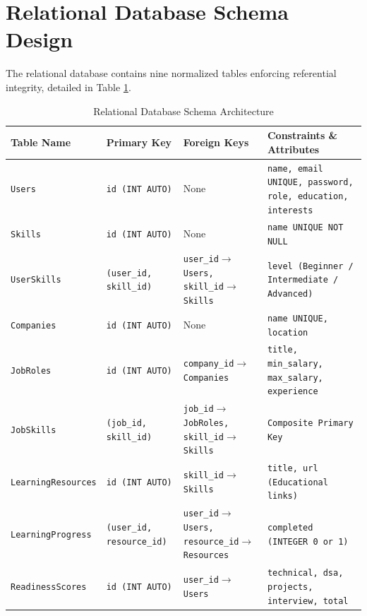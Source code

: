 \documentclass[11pt,a4paper]{report}
\begin{document}
\section{Relational Database Schema Design}
The relational database contains nine normalized tables enforcing referential integrity, detailed in Table \ref{tab:db_schema}.

\begin{table}[H]
    \centering
    \caption{Relational Database Schema Architecture}
    \label{tab:db_schema}
    \scriptsize
    \begin{tabular}{p{2.8cm}p{3.2cm}p{3.2cm}p{4.8cm}}
        \toprule
        \textbf{Table Name} & \textbf{Primary Key} & \textbf{Foreign Keys} & \textbf{Constraints \& Attributes} \\
        \midrule
        \texttt{Users} & \texttt{id (INT AUTO)} & None & \texttt{name, email UNIQUE, password, role, education, interests} \\
        \texttt{Skills} & \texttt{id (INT AUTO)} & None & \texttt{name UNIQUE NOT NULL} \\
        \texttt{UserSkills} & \texttt{(user\_id, skill\_id)} & \texttt{user\_id$\rightarrow$Users, skill\_id$\rightarrow$Skills} & \texttt{level (Beginner / Intermediate / Advanced)} \\
        \texttt{Companies} & \texttt{id (INT AUTO)} & None & \texttt{name UNIQUE, location} \\
        \texttt{JobRoles} & \texttt{id (INT AUTO)} & \texttt{company\_id$\rightarrow$Companies} & \texttt{title, min\_salary, max\_salary, experience} \\
        \texttt{JobSkills} & \texttt{(job\_id, skill\_id)} & \texttt{job\_id$\rightarrow$JobRoles, skill\_id$\rightarrow$Skills} & \texttt{Composite Primary Key} \\
        \texttt{LearningResources} & \texttt{id (INT AUTO)} & \texttt{skill\_id$\rightarrow$Skills} & \texttt{title, url (Educational links)} \\
        \texttt{LearningProgress} & \texttt{(user\_id, resource\_id)} & \texttt{user\_id$\rightarrow$Users, resource\_id$\rightarrow$Resources} & \texttt{completed (INTEGER 0 or 1)} \\
        \texttt{ReadinessScores} & \texttt{id (INT AUTO)} & \texttt{user\_id$\rightarrow$Users} & \texttt{technical, dsa, projects, interview, total} \\
        \bottomrule
    \end{tabular}
\end{table}
\end{document}
